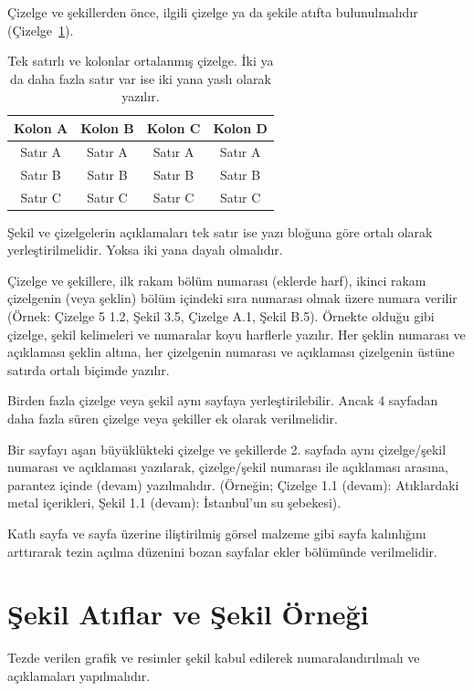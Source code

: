 \documentclass[a4paper,oneside,12pt]{report}
\begin{document}
Çizelge ve şekillerden önce, ilgili çizelge ya da şekile atıfta bulunulmalıdır (Çizelge~\ref{tab:ornek}).
\begin{table}[h]
	\centering
	\caption{Tek satırlı ve kolonlar ortalanmış çizelge. İki ya da daha fazla satır var ise iki yana yaslı olarak yazılır.}
	\begin{tabular}{cccc}
		\hline
		Kolon A & Kolon B & Kolon C & Kolon D \\
		\hline
		Satır A & Satır A & Satır A & Satır A \\
		Satır B & Satır B & Satır B & Satır B \\
		Satır C & Satır C & Satır C & Satır C \\
		\hline
	\end{tabular}
\label{tab:ornek}
\end{table}

Şekil ve çizelgelerin açıklamaları tek satır ise yazı bloğuna göre ortalı olarak yerleştirilmelidir. Yoksa iki yana dayalı olmalıdır.

Çizelge ve şekillere, ilk rakam bölüm numarası (eklerde harf), ikinci rakam çizelgenin (veya şeklin) bölüm içindeki sıra numarası olmak üzere numara verilir (Örnek: Çizelge
5 1.2, Şekil 3.5, Çizelge A.1, Şekil B.5). Örnekte olduğu gibi çizelge, şekil kelimeleri
ve numaralar koyu harflerle yazılır. 
Her şeklin numarası ve açıklaması şeklin altına, her çizelgenin numarası ve açıklaması
çizelgenin üstüne satırda ortalı biçimde yazılır.

Birden fazla çizelge veya şekil aynı sayfaya yerleştirilebilir. Ancak 4 sayfadan daha
fazla süren çizelge veya şekiller ek olarak verilmelidir.

Bir sayfayı aşan büyüklükteki çizelge ve şekillerde 2. sayfada aynı çizelge/şekil numarası ve açıklaması yazılarak, çizelge/şekil numarası ile açıklaması arasına, parantez içinde (devam) yazılmalıdır. (Örneğin; Çizelge 1.1 (devam): Atıklardaki metal içerikleri, Şekil 1.1 (devam): İstanbul’un su şebekesi). 

Katlı sayfa ve sayfa üzerine iliştirilmiş görsel malzeme gibi sayfa kalınlığını arttırarak
tezin açılma düzenini bozan sayfalar ekler bölümünde verilmelidir.

\section{Şekil Atıflar ve Şekil Örneği}
\label{sec:sekil_atif}
Tezde verilen grafik ve resimler şekil kabul edilerek numaralandırılmalı ve açıklamaları yapılmalıdır.
\end{document}
